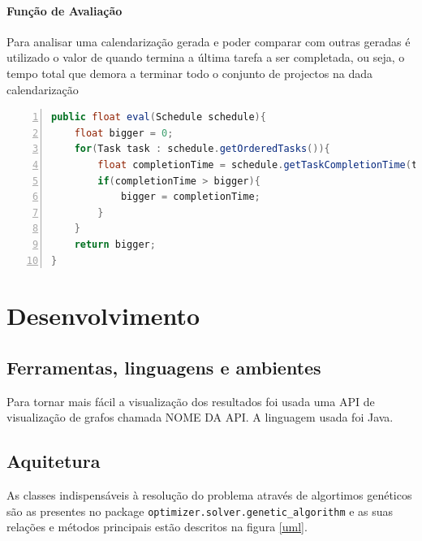 \begin{titlepage}
\paragraph{Função de Avaliação}
Para analisar uma calendarização gerada e poder comparar com outras geradas é utilizado o valor de quando termina a última tarefa a ser completada, ou seja, o tempo total que demora a terminar todo o conjunto de projectos na dada calendarização  

\begin{lstlisting}[frame=single, language=java,numbers=left,numberfirstline=true] 
public float eval(Schedule schedule){
	float bigger = 0;
	for(Task task : schedule.getOrderedTasks()){
		float completionTime = schedule.getTaskCompletionTime(task);
		if(completionTime > bigger){
			bigger = completionTime;
		}
	}
	return bigger;
}
\end{lstlisting}


\section{Desenvolvimento}

\subsection{Ferramentas, linguagens e ambientes}
\justify\normalsize
Para tornar mais fácil a visualização dos resultados foi usada uma API de visualização de grafos chamada NOME DA API. A linguagem usada foi Java.

\subsection{Aquitetura}
\justify\normalsize
As classes indispensáveis à resolução do problema através de algortimos genéticos são as presentes no package \texttt{optimizer.solver.genetic\_algorithm} e as suas relações e métodos principais estão descritos na figura \ref{uml}.


\end{titlepage}
